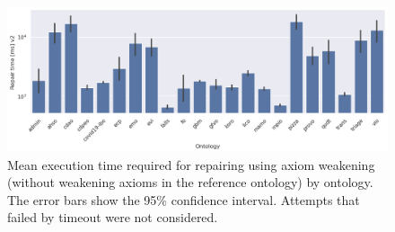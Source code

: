 \begin{figure}[htbp]
  \centering
  \includegraphics[width=\textwidth]{resources/time-enhance-ontology-bar.png}
  \caption{Mean execution time required for repairing using axiom weakening (without weakening axioms in the reference ontology) by ontology. The error bars show the 95\% confidence interval. Attempts that failed by timeout were not considered.}
\end{figure}

\fi
